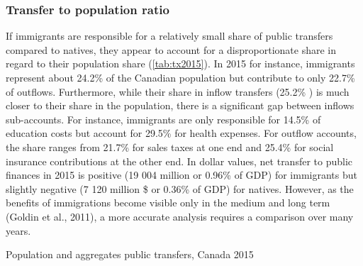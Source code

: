 \subsubsection*{Transfer to population ratio}
  If immigrants are responsible for a relatively small share of public transfers compared to natives, they appear to account for a disproportionate share in regard to their population share (\autoref{tab:tx2015}).
In 2015 for instance, immigrants represent about 24.2\% of the Canadian population but contribute to only 22.7\% of outflows.
Furthermore, while their share in inflow transfers (25.2\% ) is much closer to their share in the population, there is a significant gap between inflows sub-accounts.
For instance, immigrants are only responsible for 14.5\% of education costs but account for 29.5\% for health expenses.
For outflow accounts, the share ranges from 21.7\% for sales taxes at one end and 25.4\% for social insurance contributions at the other end.
In dollar values, net transfer to public finances in 2015 is positive (19 004 million or 0.96\% of GDP) for immigrants but slightly negative (7 120 million \$ or 0.36\% of GDP) for natives.
However, as the benefits of immigrations become visible only in the medium and long term (Goldin et al., 2011), a more accurate analysis requires a comparison over many years.

  \begin{table}[H]%
    \caption{Population and aggregates public transfers, Canada 2015}
    \label{tab:tx2015}%
    \begin{center}
   \end{center}
\end{table}%

